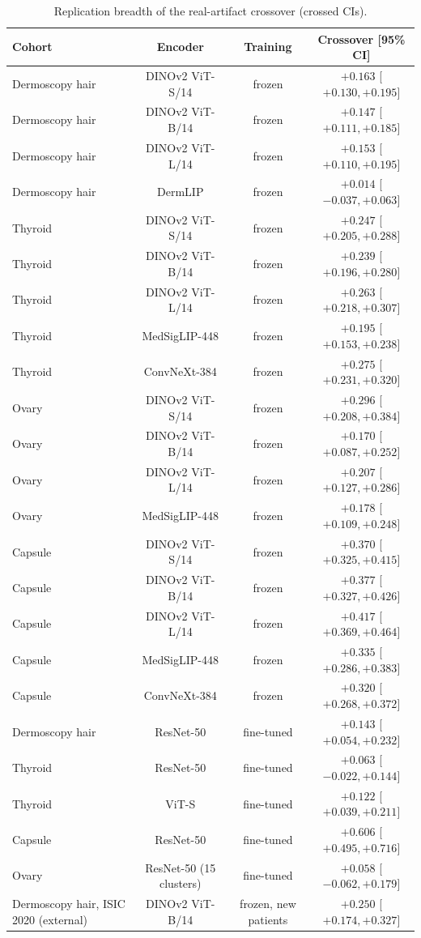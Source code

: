 \begin{table}[H]\centering\scriptsize
\caption{Replication breadth of the real-artifact crossover (crossed CIs).}\label{tab:breadth}
\begin{tabular}{lccc}\toprule
Cohort & Encoder & Training & Crossover [95\% CI] \\\midrule
Dermoscopy hair & DINOv2 ViT-S/14 & frozen & $+0.163$ [$+0.130, +0.195$] \\
Dermoscopy hair & DINOv2 ViT-B/14 & frozen & $+0.147$ [$+0.111, +0.185$] \\
Dermoscopy hair & DINOv2 ViT-L/14 & frozen & $+0.153$ [$+0.110, +0.195$] \\
Dermoscopy hair & DermLIP & frozen & $+0.014$ [$-0.037, +0.063$] \\
Thyroid & DINOv2 ViT-S/14 & frozen & $+0.247$ [$+0.205, +0.288$] \\
Thyroid & DINOv2 ViT-B/14 & frozen & $+0.239$ [$+0.196, +0.280$] \\
Thyroid & DINOv2 ViT-L/14 & frozen & $+0.263$ [$+0.218, +0.307$] \\
Thyroid & MedSigLIP-448 & frozen & $+0.195$ [$+0.153, +0.238$] \\
Thyroid & ConvNeXt-384 & frozen & $+0.275$ [$+0.231, +0.320$] \\
Ovary & DINOv2 ViT-S/14 & frozen & $+0.296$ [$+0.208, +0.384$] \\
Ovary & DINOv2 ViT-B/14 & frozen & $+0.170$ [$+0.087, +0.252$] \\
Ovary & DINOv2 ViT-L/14 & frozen & $+0.207$ [$+0.127, +0.286$] \\
Ovary & MedSigLIP-448 & frozen & $+0.178$ [$+0.109, +0.248$] \\
Capsule & DINOv2 ViT-S/14 & frozen & $+0.370$ [$+0.325, +0.415$] \\
Capsule & DINOv2 ViT-B/14 & frozen & $+0.377$ [$+0.327, +0.426$] \\
Capsule & DINOv2 ViT-L/14 & frozen & $+0.417$ [$+0.369, +0.464$] \\
Capsule & MedSigLIP-448 & frozen & $+0.335$ [$+0.286, +0.383$] \\
Capsule & ConvNeXt-384 & frozen & $+0.320$ [$+0.268, +0.372$] \\
Dermoscopy hair & ResNet-50 & fine-tuned & $+0.143$ [$+0.054, +0.232$] \\
Thyroid & ResNet-50 & fine-tuned & $+0.063$ [$-0.022, +0.144$] \\
Thyroid & ViT-S & fine-tuned & $+0.122$ [$+0.039, +0.211$] \\
Capsule & ResNet-50 & fine-tuned & $+0.606$ [$+0.495, +0.716$] \\
Ovary & ResNet-50 (15 clusters) & fine-tuned & $+0.058$ [$-0.062, +0.179$] \\
Dermoscopy hair, ISIC 2020 (external) & DINOv2 ViT-B/14 & frozen, new patients & $+0.250$ [$+0.174, +0.327$] \\
\bottomrule\end{tabular}
\end{table}
